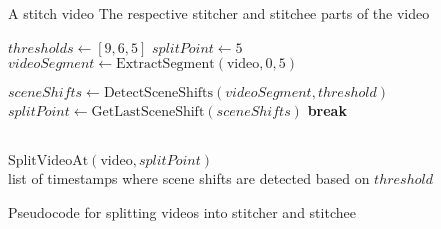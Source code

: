 \begin{algorithm}
\begin{algorithmic}[1]
\Require A stitch video
\Ensure The respective stitcher and stitchee parts of the video  %

\State $thresholds \gets [9, 6, 5]$ 
\State $splitPoint \gets 5$ 
\State $videoSegment \gets \text{ExtractSegment}(\text{video}, 0, 5)$ 

    \State $sceneShifts \gets \text{DetectSceneShifts}(videoSegment, threshold)$
        \State $splitPoint \gets \text{GetLastSceneShift}(sceneShifts)$
        \State \textbf{break}
    \EndIf
\EndFor

\\
\State $\text{SplitVideoAt}(\text{video}, splitPoint)$ 
\\

 
    \State \Return list of timestamps where scene shifts are detected based on $threshold$
\EndFunction
\end{algorithmic}
\caption{Pseudocode for splitting videos into stitcher and stitchee}
\label{pseudocode}
\end{algorithm}